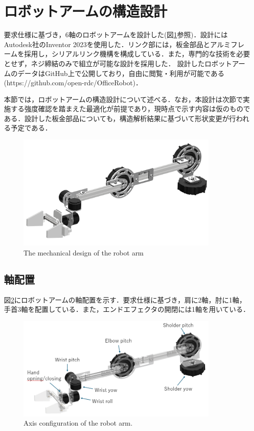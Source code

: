 
\section{ロボットアームの構造設計}
要求仕様に基づき，6軸のロボットアームを設計した(図\ref{fig:arm_design}参照)．設計にはAutodesk社のInventor 2023\cite{inventor:online}を使用した．リンク部には，板金部品とアルミフレームを採用し，シリアルリンク機構を構成している．また，専門的な技術を必要とせず，ネジ締結のみで組立が可能な設計を採用した．
設計したロボットアームのデータはGitHub上で公開しており，自由に閲覧・利用が可能である(https://github.com/open-rdc/OfficeRobot)．

本節では，ロボットアームの構造設計について述べる．なお，本設計は次節で実施する強度確認を踏まえた最適化が前提であり，現時点で示す内容は仮のものである．設計した板金部品についても，構造解析結果に基づいて形状変更が行われる予定である．

\begin{figure}
  \centering
  \includegraphics[width=10cm]{images/design/arm_design.png}
  \caption{The mechanical design of the robot arm}
  \label{fig:arm_design}
\end{figure}
\clearpage

\subsection{軸配置}
図\ref{fig:zikuhai}にロボットアームの軸配置を示す．要求仕様に基づき，肩に2軸，肘に1軸，手首3軸を配置している．また，エンドエフェクタの開閉には1軸を用いている．
\begin{figure}
  \centering
  \includegraphics[width=10cm]{images/design/skelton.png}
  \caption{Axis configuration of the robot arm.}
  \label{fig:zikuhai}
\end{figure}


